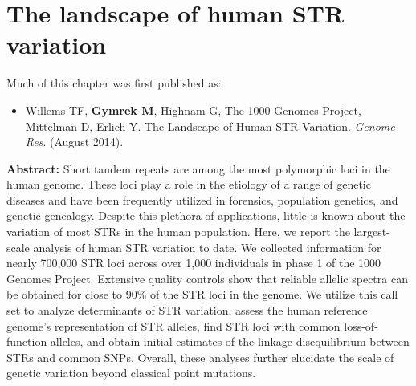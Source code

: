 \chapter{The landscape of human STR variation}
\label{chap:catalog}

\hzline

Much of this chapter was first published as:

\begin{itemize}
\item[] Willems TF, \textbf{Gymrek M}, Highnam G, The 1000 Genomes Project, Mittelman D, Erlich Y. The
  Landscape of Human STR Variation. \emph{Genome Res}. (August 2014).
\end{itemize}

\hzline

\textbf{Abstract:} Short tandem repeats are among the most polymorphic loci in the human genome. These loci play a role in the etiology of a range of genetic diseases and have been frequently utilized in forensics, population genetics, and genetic genealogy. Despite this plethora of applications, little is known about the variation of most STRs in the human population. Here, we report the largest-scale analysis of human STR variation to date. We collected information for nearly 700,000 STR loci across over 1,000 individuals in phase 1 of the 1000 Genomes Project. Extensive quality controls show that reliable allelic spectra can be obtained for close to 90\% of the STR loci in the genome. We utilize this call set to analyze determinants of STR variation, assess the human reference genome's representation of STR alleles, find STR loci with common loss-of-function alleles, and obtain initial estimates of the linkage disequilibrium between STRs and common SNPs. Overall, these analyses further elucidate the scale of genetic variation beyond classical point mutations.

